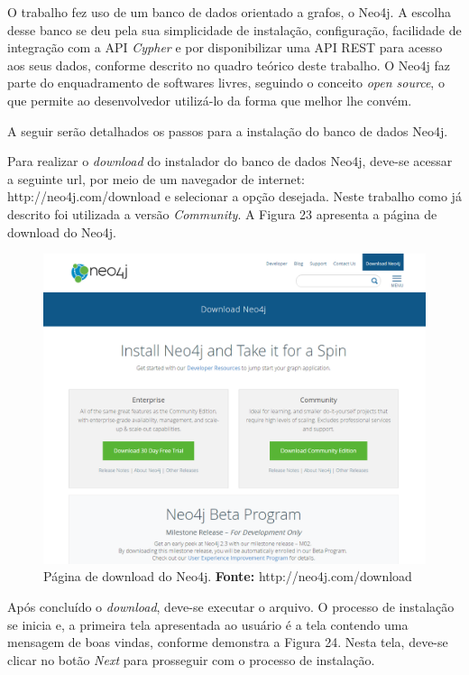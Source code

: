 \par O trabalho fez uso de um banco de dados orientado a grafos, o Neo4j. A escolha desse banco se deu pela sua simplicidade de instalação, configuração, facilidade de integração com a API \textit{Cypher} e por disponibilizar uma API REST para acesso aos seus dados, conforme descrito no quadro teórico deste trabalho. O Neo4j faz parte do enquadramento de softwares livres, seguindo o conceito \textit{open source}, o que permite ao desenvolvedor utilizá-lo da forma que melhor lhe convém. 


\par A seguir serão detalhados os passos para a instalação do banco de dados Neo4j.

\par Para realizar o \textit{download} do instalador do banco de dados Neo4j, deve-se acessar a seguinte url, por meio de um  navegador de internet: http://neo4j.com/download e selecionar a opção desejada. Neste trabalho como já descrito foi utilizada a versão \textit{Community}. A Figura 23 apresenta a página de download do Neo4j.

\newpage
\begin{figure}[h!]
	\centerline{\includegraphics[scale=0.4]{./imagens/download-neo4j.png}}
	\caption[Página de download do Neo4j]
	{Página de download do Neo4j. \textbf{Fonte:} http://neo4j.com/download}
	\label{fig:exemplo1}
\end{figure}

\par Após concluído o \textit{download}, deve-se executar o arquivo. O processo de instalação se inicia e, a primeira tela apresentada ao usuário é a tela contendo uma mensagem de boas vindas, conforme demonstra a Figura 24. Nesta tela, deve-se clicar no botão \textit{Next} para prosseguir com o processo de instalação.

